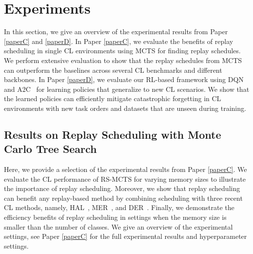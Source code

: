 \section{Experiments}\label{chap4:sec:experiments}

In this section, we give an overview of the experimental results from Paper \ref{paperC} and \ref{paperD}. In Paper \ref{paperC}, we evaluate the benefits of replay scheduling in single CL environments using MCTS for finding replay schedules. We perform extensive evaluation to show that the replay schedules from MCTS can outperform the baselines across several CL benchmarks and different backbones. 
In Paper \ref{paperD}, we evaluate our RL-based framework using DQN~\cite{mnih2013playing} and A2C~\cite{mnih2016asynchronous} for learning policies that generalize to new CL scenarios.
We show that the learned policies can efficiently mitigate catastrophic forgetting in CL environments with new task orders and datasets that are unseen during training. 


\subsection{Results on Replay Scheduling with Monte Carlo Tree Search}

Here, we provide a selection of the experimental results from Paper \ref{paperC}. %
We evaluate the CL performance of RS-MCTS for varying memory sizes to illustrate the importance of replay scheduling. Moreover, we show that replay scheduling can benefit any replay-based method by combining scheduling with three recent CL methods, namely, HAL~\cite{chaudhry2021using}, MER~\cite{riemer2018learning}, and DER~\cite{buzzega2020dark}. Finally, we demonstrate the efficiency benefits of replay scheduling in settings when the memory size is smaller than the number of classes. We give an overview of the experimental settings, see Paper \ref{paperC} for the full experimental results and hyperparameter settings. 

